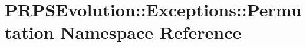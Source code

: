 \hypertarget{namespace_p_r_p_s_evolution_1_1_exceptions_1_1_permutation}{\section{\-P\-R\-P\-S\-Evolution\-:\-:\-Exceptions\-:\-:\-Permutation \-Namespace \-Reference}
\label{namespace_p_r_p_s_evolution_1_1_exceptions_1_1_permutation}
}
